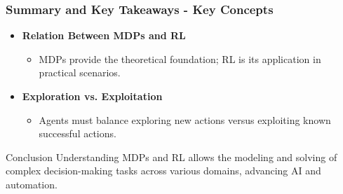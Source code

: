 \documentclass[aspectratio=169]{beamer}
\begin{document}
\begin{frame}[fragile]
  \frametitle{Summary and Key Takeaways - Key Concepts}
  \begin{itemize}
    \item \textbf{Relation Between MDPs and RL}
      \begin{itemize}
        \item MDPs provide the theoretical foundation; RL is its application in practical scenarios.
      \end{itemize}
      
    \item \textbf{Exploration vs. Exploitation}
      \begin{itemize}
        \item Agents must balance exploring new actions versus exploiting known successful actions.
      \end{itemize}
  \end{itemize}

  \begin{block}{Conclusion}
    Understanding MDPs and RL allows the modeling and solving of complex decision-making tasks across various domains, advancing AI and automation.
  \end{block}
\end{frame}
\end{document}
